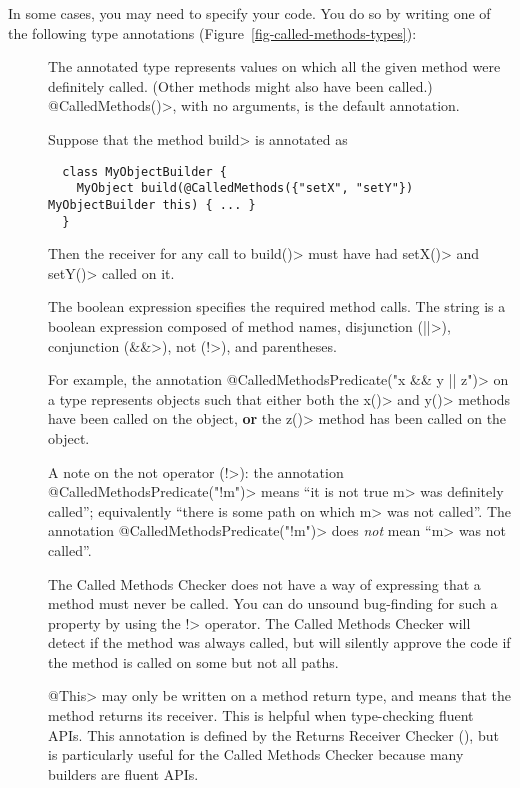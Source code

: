 In some cases, you may need to specify your code. You do so by writing one of the following type
annotations (Figure~\ref{fig-called-methods-types}):
\begin{description}
\item[]
  The annotated type represents values on which all the given method were definitely called.
  (Other methods might also have been called.) \<@CalledMethods()>, with no
  arguments, is the default annotation.

  Suppose that the method \<build> is annotated as

  \begin{Verbatim}
  class MyObjectBuilder {
    MyObject build(@CalledMethods({"setX", "setY"}) MyObjectBuilder this) { ... }
  }
  \end{Verbatim}

  Then the receiver for any call to \<build()> must have had \<setX()> and \<setY()> called on it.

\item[]
  The boolean expression specifies the required method calls.  The string
  is a boolean expression composed of method names, disjunction (\<||>),
  conjunction (\<\&\&>), not (\<!>), and parentheses.

  For example, the annotation \<@CalledMethodsPredicate("x \&\& y || z")> on a type represents
  objects such that either both the  \<x()> and \<y()> methods have been called on the object, \textbf{or}
  the \<z()> method has been called on the object.

  A note on the not operator (\<!>): the annotation
  \<@CalledMethodsPredicate("!m")> means ``it is not true \<m> was
  definitely called''; equivalently ``there is some path on which \<m> was
  not called''.  The annotation \<@CalledMethodsPredicate("!m")> does
  \emph{not} mean ``\<m> was not called''.

  The Called Methods Checker does not have a way of expressing that a
  method must never be called.  You can do unsound bug-finding for such a
  property by using the \<!> operator.  The Called Methods Checker will
  detect if the method was always called, but will silently approve the code
  if the method is called on some but not all paths.

\item[]
  \<@This> may only be written on a method return type, and means that the method returns its receiver.
  This is helpful when type-checking fluent APIs. This annotation is defined by the
  Returns Receiver Checker (), but is particularly useful
  for the Called Methods Checker because many builders are fluent APIs.


\end{description}
